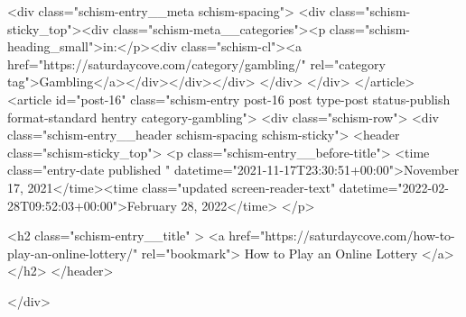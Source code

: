 {		<div class="schism-entry__meta schism-spacing">			<div class="schism-sticky_top"><div class="schism-meta__categories"><p class="schism-heading_small">in:</p><div class="schism-cl"><a href="https://saturdaycove.com/category/gambling/" rel="category tag">Gambling</a></div></div></div>		</div>
	</div>
</article>
<article id="post-16" class="schism-entry post-16 post type-post status-publish format-standard hentry category-gambling">
	<div class="schism-row">		<div class="schism-entry__header schism-spacing schism-sticky">			<header class="schism-sticky_top">				<p class="schism-entry__before-title">
					<time class="entry-date published " datetime="2021-11-17T23:30:51+00:00">November 17, 2021</time><time class="updated screen-reader-text" datetime="2022-02-28T09:52:03+00:00">February 28, 2022</time>				</p>

				<h2 class="schism-entry__title" >
					<a href="https://saturdaycove.com/how-to-play-an-online-lottery/" rel="bookmark">
						How to Play an Online Lottery					</a>
				</h2>
			</header>

					</div>

}
